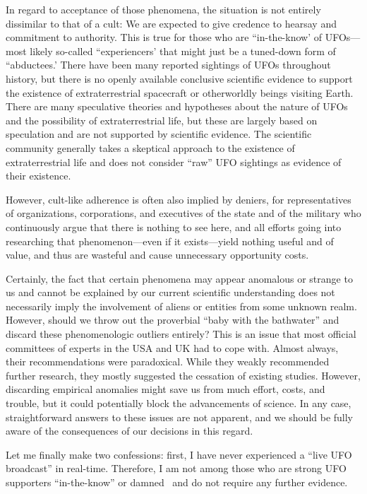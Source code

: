 In regard to acceptance of those phenomena, the situation is not entirely dissimilar to that of a cult:
We are expected to give credence to hearsay and commitment to authority.
This is true for those who are ``in-the-know' of UFOs---most likely so-called ``experiencers' that might just be a tuned-down form of ``abductees.'
There have been many reported sightings of UFOs throughout history,
but there is no openly available conclusive scientific evidence
to support the existence of extraterrestrial spacecraft or otherworldly beings visiting Earth.
There are many speculative theories and hypotheses about the nature of UFOs and the possibility of extraterrestrial life,
but these are largely based on speculation and are not supported by scientific evidence.
The scientific community generally takes a skeptical approach to the existence of extraterrestrial life and does not consider
``raw'' UFO sightings as evidence of their existence.

However, cult-like adherence is often also implied by deniers,
for representatives of organizations, corporations, and executives of the state and of the military who continuously argue
that there is nothing to see here, and all efforts going into researching that phenomenon---even if it exists---yield nothing useful and of value,
and thus are wasteful and cause unnecessary opportunity costs.


Certainly, the fact that certain phenomena may appear anomalous or strange to us and cannot be explained
by our current scientific understanding does not necessarily imply the involvement of aliens or entities from some unknown realm.
However, should we throw out the proverbial ``baby with the bathwater'' and discard these phenomenologic outliers entirely?
This is an issue that most official committees of experts in the USA and UK had to cope with.
Almost always, their recommendations were paradoxical.
While they weakly recommended further research, they mostly suggested the cessation of existing studies.
However, discarding empirical anomalies might save us from much effort, costs, and trouble, but it could potentially block the advancements of science. In any case, straightforward answers to these issues are not apparent,
and we should be fully aware of the consequences of our decisions in this regard.



Let me finally make two confessions: first, I have never experienced a ``live UFO broadcast'' in real-time.
Therefore, I am not among those who are strong UFO supporters ``in-the-know'' or damned~\cite{FortBotD}
and do not require any further evidence.

